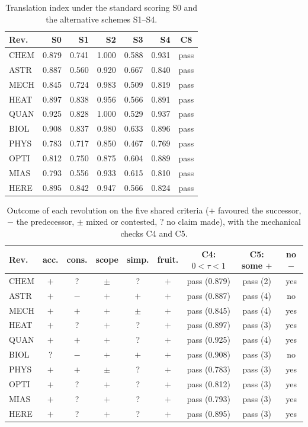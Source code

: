 \begin{table}[!htb]\centering\footnotesize
\caption{Translation index under the standard scoring S0 and the alternative schemes S1--S4.}\label{tab:sens}
\begin{tabular}{@{}lrrrrrc@{}}\toprule
Rev. & S0 & S1 & S2 & S3 & S4 & C8\\\midrule
CHEM & 0.879 & 0.741 & 1.000 & 0.588 & 0.931 & pass\\
ASTR & 0.887 & 0.560 & 0.920 & 0.667 & 0.840 & pass\\
MECH & 0.845 & 0.724 & 0.983 & 0.509 & 0.819 & pass\\
HEAT & 0.897 & 0.838 & 0.956 & 0.566 & 0.891 & pass\\
QUAN & 0.925 & 0.828 & 1.000 & 0.529 & 0.937 & pass\\
BIOL & 0.908 & 0.837 & 0.980 & 0.633 & 0.896 & pass\\
PHYS & 0.783 & 0.717 & 0.850 & 0.467 & 0.769 & pass\\
OPTI & 0.812 & 0.750 & 0.875 & 0.604 & 0.889 & pass\\
MIAS & 0.793 & 0.556 & 0.933 & 0.615 & 0.810 & pass\\
HERE & 0.895 & 0.842 & 0.947 & 0.566 & 0.824 & pass\\
\bottomrule\end{tabular}\end{table}

\begin{table}[!htb]\centering\footnotesize
\caption{Outcome of each revolution on the five shared criteria ($+$ favoured the successor, $-$ the predecessor, $\pm$ mixed or contested, ? no claim made), with the mechanical checks C4 and C5.}\label{tab:crit}
\begin{tabular}{@{}lcccccccc@{}}\toprule
Rev. & acc. & cons. & scope & simp. & fruit. & C4: $0<\tau<1$ & C5: some $+$ & no $-$\\\midrule
CHEM & $+$ & ? & $\pm$ & ? & $+$ & pass (0.879) & pass (2) & yes\\
ASTR & $+$ & $-$ & $+$ & $+$ & $+$ & pass (0.887) & pass (4) & no\\
MECH & $+$ & $+$ & $+$ & $\pm$ & $+$ & pass (0.845) & pass (4) & yes\\
HEAT & $+$ & ? & $+$ & ? & $+$ & pass (0.897) & pass (3) & yes\\
QUAN & $+$ & $+$ & $+$ & ? & $+$ & pass (0.925) & pass (4) & yes\\
BIOL & ? & $-$ & $+$ & $+$ & $+$ & pass (0.908) & pass (3) & no\\
PHYS & $+$ & $+$ & $\pm$ & ? & $+$ & pass (0.783) & pass (3) & yes\\
OPTI & $+$ & ? & $+$ & ? & $+$ & pass (0.812) & pass (3) & yes\\
MIAS & $+$ & ? & $+$ & ? & $+$ & pass (0.793) & pass (3) & yes\\
HERE & $+$ & ? & $+$ & ? & $+$ & pass (0.895) & pass (3) & yes\\
\bottomrule\end{tabular}\end{table}

